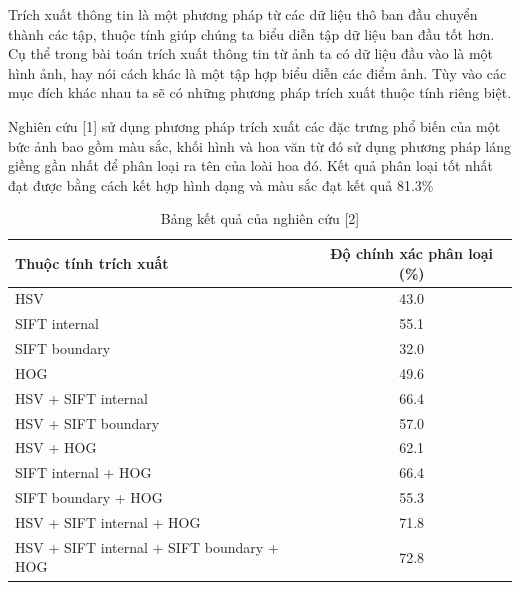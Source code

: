 \documentclass[12pt]{report}
\begin{document}
		Trích xuất thông tin là một phương pháp từ các dữ liệu thô ban đầu chuyển thành các tập, thuộc tính giúp chúng ta biểu diễn tập dữ liệu ban đầu tốt hơn. Cụ thể trong bài toán trích xuất thông tin từ ảnh ta có dữ liệu đầu vào là một hình ảnh, hay nói cách khác là một tập hợp biểu diễn các điểm ảnh. Tùy vào các mục đích khác nhau ta sẽ có những phương pháp trích xuất thuộc tính riêng biệt.
																																												
		Nghiên cứu [1] sử dụng phương pháp trích xuất các đặc trưng phổ biến của một bức ảnh bao gồm màu sắc, khối hình và hoa văn từ đó sử dụng phương pháp láng giềng gần nhất để phân loại ra tên của loài hoa đó. Kết quả phân loại tốt nhất đạt được bằng cách kết hợp hình dạng và màu sắc đạt kết quả 81.3\%
																																												
																																												
																																										
		\begin{table}[h]
			\centering
			\caption{Bảng kết quả của nghiên cứu [2]}
			\label{tbl:table ket qua cua Nilsback08}
			\begin{tabular}{|l|c|}
				\hline
				\textbf{Thuộc tính trích xuất}      & \textbf{Độ chính xác phân loại (\%)} \\ \hline
				HSV                                       & 43.0                                         \\ \hline
				SIFT internal                             & 55.1                                         \\ \hline
				SIFT boundary                             & 32.0                                         \\ \hline
				HOG                                       & 49.6                                         \\ \hline
				HSV + SIFT internal                       & 66.4                                         \\ \hline
				HSV + SIFT boundary                       & 57.0                                         \\ \hline
				HSV + HOG                                 & 62.1                                         \\ \hline
				SIFT internal + HOG                       & 66.4                                         \\ \hline
				SIFT boundary + HOG                       & 55.3                                         \\ \hline
				HSV + SIFT internal + HOG                 & 71.8                                         \\ \hline
				HSV + SIFT internal + SIFT boundary + HOG & 72.8                                         \\ \hline
																																																																																				
			\end{tabular}
		\end{table}
																																												
\end{document}
